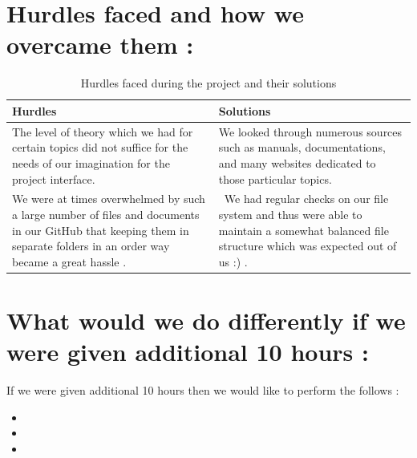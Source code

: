 \documentclass{article}
\begin{document}
\section*{Hurdles faced and how we overcame them :}



\begin{table}[H]
\centering
\begin{tabular}{|p{4cm}|p{9cm}|}
\hline
\textbf{Hurdles} & \textbf{Solutions} \\ 
\hline

The level of theory which we had for certain topics did not suffice for the needs of our imagination for the project interface. 
&
We looked through numerous sources such as manuals, documentations, and many websites dedicated to those particular topics. \\

\hline
We were at times overwhelmed by such a large number of files and documents in our GitHub that keeping them in separate folders in an order way became a great hassle .

 & \ We had regular checks on our file system and thus were able to maintain a somewhat balanced file structure which was expected out of us :) . 
\end{tabular}
\caption{Hurdles faced during the project and their solutions}
\end{table}


\section*{What would we do differently if we were given additional 10 hours : }
If we were given additional 10 hours then we would like to perform the follows :
\begin{itemize}
    \item {}
    \item {}
    \item {}
\end{itemize}
\end{document}
